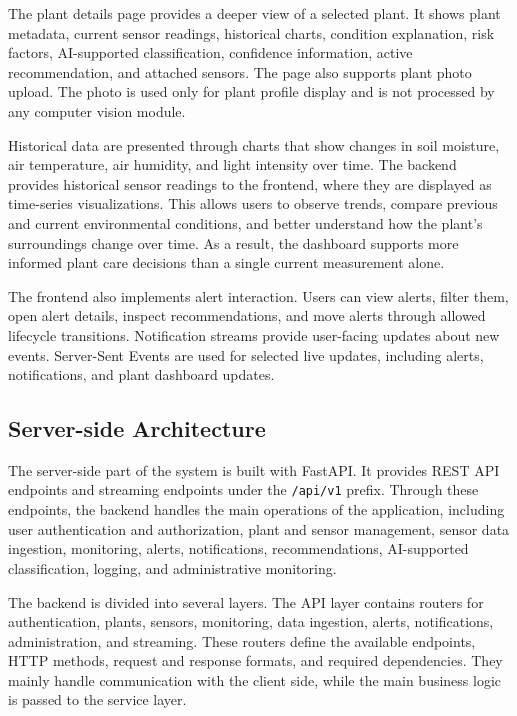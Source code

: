 The plant details page provides a deeper view of a selected plant. It shows plant metadata, current sensor readings, historical charts, condition explanation, risk factors, AI-supported classification, confidence information, active recommendation, and attached sensors. The page also supports plant photo upload. The photo is used only for plant profile display and is not processed by any computer vision module.

Historical data are presented through charts that show changes in soil moisture, air temperature, air humidity, and light intensity over time. The backend provides historical sensor readings to the frontend, where they are displayed as time-series visualizations. This allows users to observe trends, compare previous and current environmental conditions, and better understand how the plant's surroundings change over time. As a result, the dashboard supports more informed plant care decisions than a single current measurement alone.

The frontend also implements alert interaction. Users can view alerts, filter them, open alert details, inspect recommendations, and move alerts through allowed lifecycle transitions. Notification streams provide user-facing updates about new events. Server-Sent Events are used for selected live updates, including alerts, notifications, and plant dashboard updates.

\subsection{Server-side Architecture}
\label{subsec:server-side-architecture}

The server-side part of the system is built with FastAPI. It provides REST API endpoints and streaming endpoints under the \texttt{/api/v1} prefix. Through these endpoints, the backend handles the main operations of the application, including user authentication and authorization, plant and sensor management, sensor data ingestion, monitoring, alerts, notifications, recommendations, AI-supported classification, logging, and administrative monitoring.

The backend is divided into several layers. The API layer contains routers for authentication, plants, sensors, monitoring, data ingestion, alerts, notifications, administration, and streaming. These routers define the available endpoints, HTTP methods, request and response formats, and required dependencies. They mainly handle communication with the client side, while the main business logic is passed to the service layer.

